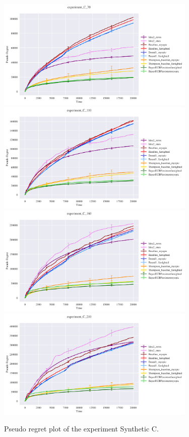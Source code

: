 \begin{figure}[H]
	\centering
	\includegraphics[width=9.5cm]{./images/C/experiment_C_70 ANALYTICS.png}\quad\includegraphics[width=9.5cm]{./images/C/experiment_C_110 ANALYTICS.png}
	\includegraphics[width=9.5cm]{./images/C/experiment_C_160 ANALYTICS.png}\quad\includegraphics[width=9.5cm]{./images/C/experiment_C_210 ANALYTICS.png}
	\caption{Pseudo regret plot of the experiment Synthetic C.}
	
\end{figure}

